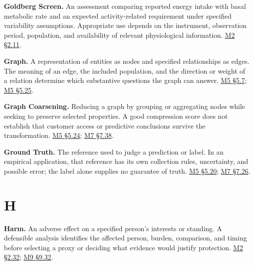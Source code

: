 \noindent\textbf{Goldberg Screen.} An assessment comparing reported energy intake
with basal metabolic rate and an expected activity-related requirement
under specified variability assumptions. Appropriate use depends on the
instrument, observation period, population, and availability of relevant
physiological information.
\href{Marketing_Analytics_Lecture_Notes.pdf\#M02-mhealth-nutrition-knowledge-and-sample-restrictions}{M2
§2.11}.

\noindent\textbf{Graph.} A representation of entities as nodes and specified
relationships as edges. The meaning of an edge, the included population,
and the direction or weight of a relation determine which substantive
questions the graph can answer.
\href{Marketing_Analytics_Lecture_Notes.pdf\#M05-networks-connections-reach-and-brokerage}{M5
§5.7};
\href{Marketing_Analytics_Lecture_Notes.pdf\#M05-attributed-claims-and-graph-relationships}{M5
§5.25}.

\noindent\textbf{Graph Coarsening.} Reducing a graph by grouping or aggregating
nodes while seeking to preserve selected properties. A good compression
score does not establish that customer access or predictive conclusions
survive the transformation.
\href{Marketing_Analytics_Lecture_Notes.pdf\#M05-compressing-a-network-and-preserving-customer-access}{M5
§5.24};
\href{Marketing_Analytics_Lecture_Notes.pdf\#M07-network-compression-label-purity-and-predictive-evidence}{M7
§7.38}.

\noindent\textbf{Ground Truth.} The reference used to judge a prediction or
label. In an empirical application, that reference has its own
collection rules, uncertainty, and possible error; the label alone
supplies no guarantee of truth.
\href{Marketing_Analytics_Lecture_Notes.pdf\#M05-evaluate-the-grader-and-justify-the-rubric}{M5
§5.20};
\href{Marketing_Analytics_Lecture_Notes.pdf\#M07-evaluation-coverage-and-the-costs-of-grading-errors}{M7
§7.26}.

\par{}
\hypertarget{module-h}{%
\section*{H}\label{module-h}}

\noindent\textbf{Harm.} An adverse effect on a specified person's interests or
standing. A defensible analysis identifies the affected person, burden,
comparison, and timing before selecting a proxy or deciding what
evidence would justify protection.
\href{Marketing_Analytics_Lecture_Notes.pdf\#M02-defining-harm-before-choosing-its-measure}{M2
§2.32};
\hyperref[M09-who-counts-as-a-stakeholder-and-why]{M9
§9.32}.

